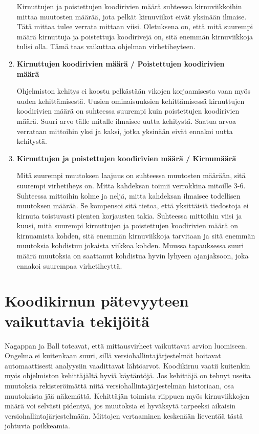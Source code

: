 \documentclass[finnish]{../tktltiki2}
\theoremstyle{definition}
\theoremstyle{remark}
\begin{document}
\begin{enumerate}
    Kirnuttujen ja poistettujen koodirivien määrä suhteessa kirnuviikkoihin mittaa muutosten määrää, jota pelkät kirnuviikot eivät yksinään ilmaise. Tätä mittaa tulee verrata mittaan viisi. Oletuksena on, että mitä suurempi määrä kirnuttuja ja poistettuja koodirivejä on, sitä enemmän kirnuviikkoja tulisi olla. Tämä taas vaikuttaa ohjelman virhetiheyteen.

    \item {\bf Kirnuttujen koodirivien määrä / Poistettujen koodirivien\\määrä}
    
    Ohjelmiston kehitys ei koostu pelkästään vikojen korjaamisesta vaan myös uuden kehittämisestä. Uusien ominaisuuksien kehittämisessä kirnuttujen koodirivien määrä on suhteessa suurempi kuin poistettujen koodirivien määrä. Suuri arvo tälle mitalle ilmaisee uutta kehitystä. Saatua arvoa verrataan mittoihin yksi ja kaksi, jotka yksinään eivät ennakoi uutta kehitystä.

    \item {\bf Kirnuttujen ja poistettujen koodirivien määrä / Kirnumäärä}
    
    Mitä suurempi muutoksen laajuus on suhteessa muutosten määrään, sitä suurempi virhetiheys on. Mitta kahdeksan toimii verrokkina mitoille 3-6. Suhteessa mittoihin kolme ja neljä, mitta kahdeksan ilmaisee todellisen muutoksen määrää. Se kompensoi sitä tietoa, että yksittäisiä tiedostoja ei kirnuta toistuvasti pienten korjausten takia. Suhteessa mittoihin viisi ja kuusi, mitä suurempi kirnuttujen ja poistettujen koodirivien määrä on kirnuamista kohden, sitä enemmän kirnuviikkoja tarvitaan ja sitä enemmän muutoksia kohdistuu jokaista viikkoa kohden. Muussa tapauksessa suuri määrä muutoksia on saattanut kohdistua hyvin lyhyeen ajanjaksoon, joka ennakoi suurempaa virhetiheyttä.

\end{enumerate}

\section{Koodikirnun pätevyyteen vaikuttavia tekijöitä}

Nagappan ja Ball toteavat, että mittausvirheet vaikuttavat arvion luomiseen. Ongelma ei kuitenkaan suuri, sillä versiohallintajärjestelmät hoitavat automaattisesti analyysiin vaadittavat lähtöarvot. Koodikirnu vaatii kuitenkin myös ohjelmiston kehittäjältä hyviä käytäntöjä. Jos kehittäjä on tehnyt useita muutoksia rekisteröimättä niitä versiohallintajärjestelmän historiaan, osa muutoksista jää näkemättä. Kehittäjän toimista riippuen myös kirnuviikkojen määrä voi selvästi pidentyä, jos muutoksia ei hyväksytä tarpeeksi aikaisin versiohallintajärjestelmään. Mittojen vertaaminen keskenään lieventää tästä johtuvia poikkeamia.
\end{document}
